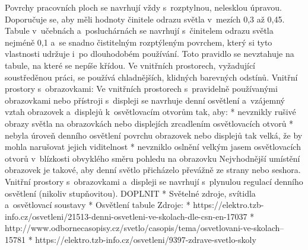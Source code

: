 Povrchy pracovních ploch se navrhují vždy s~rozptylnou, nelesklou úpravou. Doporučuje se, aby měli hodnoty
činitele odrazu světla v~mezích 0,3 až 0,45.
\medskip
Tabule v~učebnách a~posluchárnách se navrhují s~činitelem odrazu světla nejméně 0,1 a~se snadno čistitelným
rozptýleným povrchem, který si tyto vlastnosti udržuje i~po dlouhodobém používání.
Toto pravidlo se nevztahuje na tabule, na které se nepíše křídou.
\medskip
Ve vnitřních prostorech, vyžadující soustředěnou práci, se používá chladnějších, klidných barevných odstínů.
\medskip
Vnitřní prostory s~obrazovkami:
\medskip
Ve vnitřních prostorech s~pravidelně používanými obrazovkami nebo přístroji s~displeji se navrhuje denní
osvětlení a~vzájemný vztah obrazovek a~displejů k~osvětlovacím otvorům tak, aby:
\medskip
\begitems
    * nevznikly rušivé obrazy světla na obrazovkách nebo displejích zrcadlením osvětlovacích otvorů
    * nebyla úroveň denního osvětlení povrchu obrazovek nebo displejů tak velká, že by mohla narušovat jejich viditelnost
    * nevzniklo oslnění velkým jasem osvětlovacích otvorů v~blízkosti obvyklého směru pohledu na obrazovku
\enditems
\medskip
Nejvhodnější umístění obrazovek je takové, aby denní světlo přicházelo převážně ze strany nebo seshora.
\medskip
Vnitřní prostory s~obrazovkami a~displeji se navrhují s~plynulou regulací denního osvětlení (nikoliv stupňovitou).
\medskip
{\sbf DOPLNIT}
\begitems
* Světelné zdroje, svítidla a~osvětlovací soustavy
* Osvětlení tabule
\enditems
\medskip
{\sbf Zdroje:}
\begitems
* https://elektro.tzb-info.cz/osvetleni/21513-denni-osvetleni-ve-skolach-dle-csn-en-17037
* http://www.odbornecasopisy.cz/svetlo/casopis/tema/osvetlovani-ve-skolach--15781
* https://elektro.tzb-info.cz/osvetleni/9397-zdrave-svetlo-skoly
\enditems





